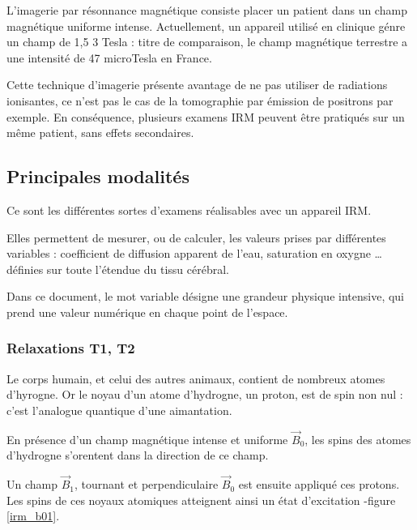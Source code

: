 L'imagerie par r\'esonnance magn\'etique consiste  placer un patient dans un champ magn\'etique uniforme intense. %
Actuellement, un appareil utilis\'e en clinique g\'enre un champ de 1,5  3 Tesla : %
 titre de comparaison, le champ magn\'etique terrestre a une intensit\'e de 47 microTesla en France.

\par
Cette technique d'imagerie pr\'esente avantage de ne pas utiliser de radiations ionisantes, %
ce n'est pas le cas de la tomographie par \'emission de positrons par exemple. %
En cons\'equence, plusieurs examens IRM peuvent \^etre pratiqu\'es sur un m\^eme patient, sans effets secondaires.

\subsection{Principales modalit\'es}

Ce sont les diff\'erentes sortes d'examens r\'ealisables avec un appareil IRM.

\par
Elles permettent de mesurer, ou de calculer, les valeurs prises par diff\'erentes variables : %
coefficient de diffusion apparent de l'eau, saturation en oxygne \dots %
d\'efinies sur toute l'\'etendue du tissu c\'er\'ebral.

\par
Dans ce document, le mot variable d\'esigne une grandeur physique intensive, qui prend une valeur num\'erique en chaque point de l'espace.

\subsubsection{Relaxations T1, T2}

Le corps humain, et celui des autres animaux, contient de nombreux atomes d'hyrogne. %
Or le noyau d'un atome d'hydrogne, un proton, est de spin non nul : c'est l'analogue quantique d'une aimantation.

\par
En pr\'esence d'un champ magn\'etique intense et uniforme $\vec{B}_0$, les spins des atomes d'hydrogne s'orentent dans la direction de ce champ.

\par
Un champ $\vec{B}_1$, tournant et perpendiculaire  $\vec{B}_0$ est ensuite appliqu\'e  ces protons. %
Les spins de ces noyaux atomiques atteignent ainsi un \'etat d'excitation -figure \ref{irm_b01}.

